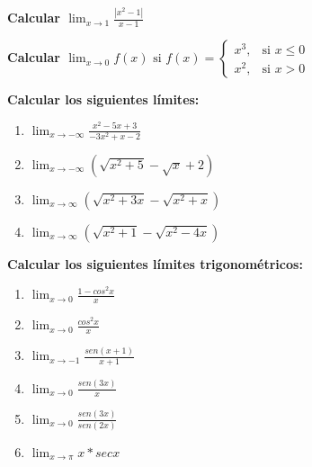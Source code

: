 \documentclass[answers]{exam} %
\begin{document}
\begin{questions}
	\vspace{0.5cm}

	\question \large\textbf{Calcular $\displaystyle \lim_{x\to{1}} \frac{|x^2-1|}{x-1}$}
	\begin{solution}
	\end{solution}

	\vspace{0.5cm}

	\question \large\textbf{Calcular $\displaystyle \lim_{x\to{0}} f(x) \text{ si } f(x) =
			\begin{cases}
				x^3, &  \text{si } x \leq 0 \\
				x^2, &  \text{si } x > 0
			\end{cases}$}
	\begin{solution}
	\end{solution}

	\vspace{0.5cm}

	\question \large\textbf{Calcular los siguientes límites:}
	\begin{enumerate}[label=\alph*.]
		\item $\displaystyle \lim_{x\to{-\infty}} \frac{x^2-5x+3}{-3x^2+x-2}$
		\item $\displaystyle \lim_{x\to{-\infty}} (\sqrt{x^2+5}-\sqrt{x}+2)$
		\item $\displaystyle \lim_{x\to{\infty}} (\sqrt{x^2+3x}-\sqrt{x^2+x})$
		\item $\displaystyle \lim_{x\to{\infty}} (\sqrt{x^2+1}-\sqrt{x^2-4x})$
	\end{enumerate}
	\begin{solution}
	\end{solution}

	\vspace{0.5cm}

	\question \large\textbf{Calcular los siguientes límites trigonométricos:}
	\begin{enumerate}[label=\alph*.]
		\item $\displaystyle \lim_{x\to{0}} \frac{1- cos^2 x}{x}$
		\item $\displaystyle \lim_{x\to{0}} \frac{cos^2 x}{x}$
		\item $\displaystyle \lim_{x\to{-1}} \frac{sen(x+1)}{x+1}$
		\item $\displaystyle \lim_{x\to{0}} \frac{sen(3x)}{x}$
		\item $\displaystyle \lim_{x\to{0}} \frac{sen(3x)}{sen(2x)}$
		\item $\displaystyle \lim_{x\to{\pi}} x * secx$
	\end{enumerate}
	\begin{solution}
	\end{solution}

	\vspace{0.5cm}

\end{questions}
\end{document}
